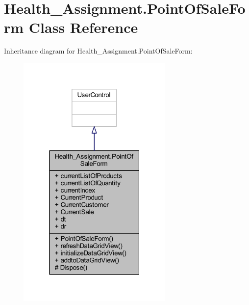\hypertarget{class_health___assignment_1_1_point_of_sale_form}{}\section{Health\+\_\+\+Assignment.\+Point\+Of\+Sale\+Form Class Reference}
\label{class_health___assignment_1_1_point_of_sale_form}


Inheritance diagram for Health\+\_\+\+Assignment.\+Point\+Of\+Sale\+Form\+:\nopagebreak
\begin{figure}[H]
\begin{center}
\leavevmode
\includegraphics[width=217pt]{class_health___assignment_1_1_point_of_sale_form__inherit__graph}
\end{center}
\end{figure}



